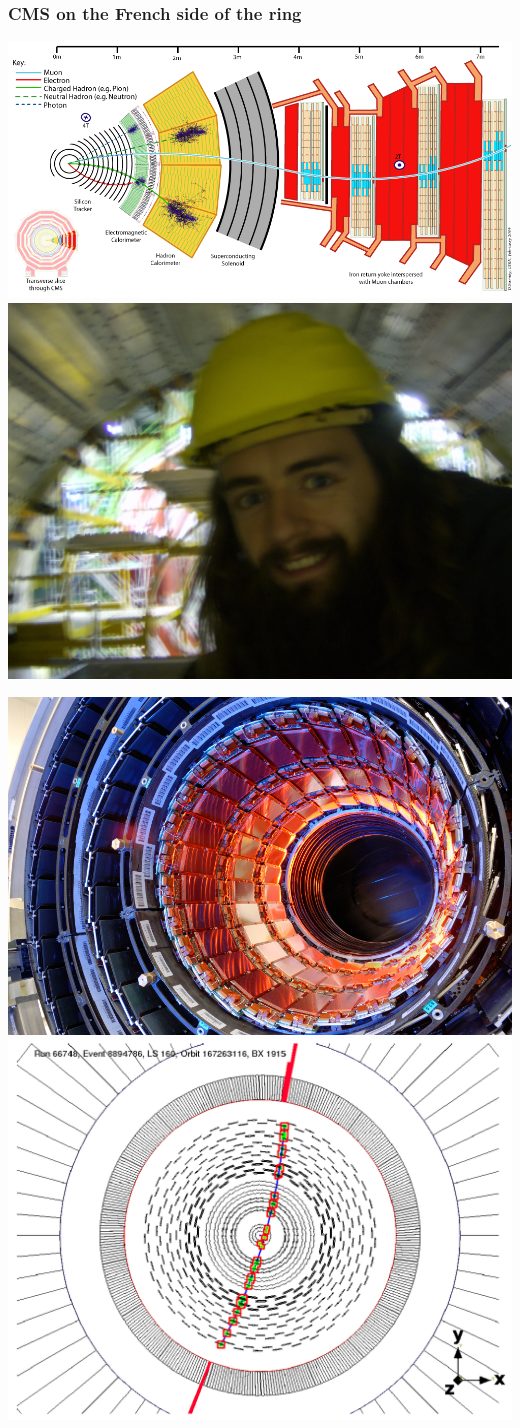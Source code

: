 \documentclass[compress]{beamer}
\begin{document}
\begin{frame}
\frametitle{CMS on the French side of the ring}

\includegraphics[height=3.5 cm]{cms_particles.png} \includegraphics[height=3.5 cm]{hpim0592_SMILE.jpg}

\vfill

\mbox{\hspace{-0.4 cm}\includegraphics[height=4.1 cm]{tracker.jpg}} \hspace{0.1 cm}
\mbox{\includegraphics[height=4.1 cm]{cosmic_event.png} \hspace{-1 cm}}

\end{frame}
\end{document}
